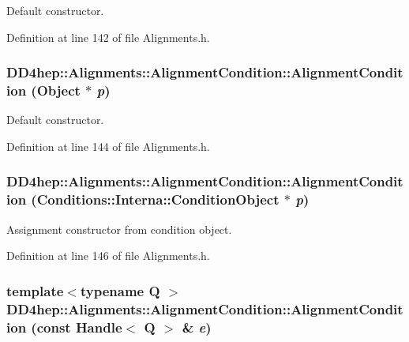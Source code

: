 Default constructor. 

Definition at line 142 of file Alignments.h.\hypertarget{class_d_d4hep_1_1_alignments_1_1_alignment_condition_a39dcb2c2af405eef6cdf0c35bd159823}{
\subsubsection[{AlignmentCondition}]{\setlength{\rightskip}{0pt plus 5cm}DD4hep::Alignments::AlignmentCondition::AlignmentCondition ({\bf Object} $\ast$ {\em p})}}
\label{class_d_d4hep_1_1_alignments_1_1_alignment_condition_a39dcb2c2af405eef6cdf0c35bd159823}


Default constructor. 

Definition at line 144 of file Alignments.h.\hypertarget{class_d_d4hep_1_1_alignments_1_1_alignment_condition_a5bd168115013833363882f86fe7b8259}{
\subsubsection[{AlignmentCondition}]{\setlength{\rightskip}{0pt plus 5cm}DD4hep::Alignments::AlignmentCondition::AlignmentCondition ({\bf Conditions::Interna::ConditionObject} $\ast$ {\em p})}}
\label{class_d_d4hep_1_1_alignments_1_1_alignment_condition_a5bd168115013833363882f86fe7b8259}


Assignment constructor from condition object. 

Definition at line 146 of file Alignments.h.\hypertarget{class_d_d4hep_1_1_alignments_1_1_alignment_condition_ab68255f67f7240febe0074888d428ee5}{
\subsubsection[{AlignmentCondition}]{\setlength{\rightskip}{0pt plus 5cm}template$<$typename Q $>$ DD4hep::Alignments::AlignmentCondition::AlignmentCondition (const {\bf Handle}$<$ Q $>$ \& {\em e})}}
\label{class_d_d4hep_1_1_alignments_1_1_alignment_condition_ab68255f67f7240febe0074888d428ee5}


